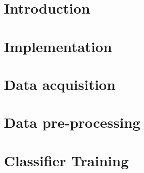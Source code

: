 \documentclass[12pt]{report}
\begin{document}



%
%

\tableofcontents{}
\listoffigures
\listoftables

\chapter{Introduction}





\chapter{Implementation}


\chapter{Data acquisition}
\label{data-acquisition}


\chapter{Data pre-processing}


% 

% 

% 

% 

\chapter{Classifier Training}

\end{document}
